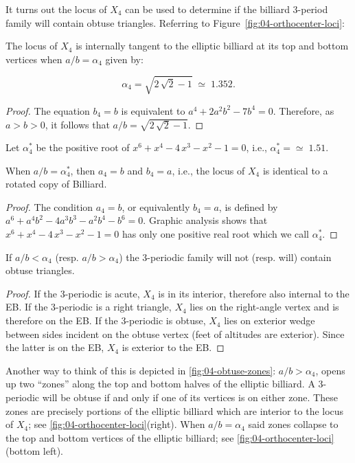 It turns out the locus of $X_4$ can be used to determine if the billiard 3-period family will contain obtuse triangles. Referring to Figure~\ref{fig:04-orthocenter-loci}:

\begin{proposition}
The locus of $X_4$ is internally tangent to the elliptic billiard at its top and bottom vertices when $a/b=\alpha_4$ given by:

\[\alpha_4 = \sqrt{2\,\sqrt {2}-1}\;{\simeq}\;1.352.\]
\label{prop:04-alpha4}
\end{proposition}

\begin{proof}
The equation $b_4=b$ is equivalent to $a^4+2a^2b^2-7b^4=0.$ Therefore, as $a>b>0$, it follows that $a/b=\sqrt{2\,\sqrt {2}-1}.$
\end{proof}

\noindent Let $\alpha_4^*$ be the positive root of
${x}^{6}+{x}^{4}-4\,{x}^{3}-{x}^{2}-1=0$, i.e.,
$\alpha_4^{*}={\simeq}\;1.51$. 

\begin{proposition}
When $a/b=\alpha_4^{*}$, then $a_4=b$ and $b_4=a$, i.e., the locus of $X_4$ is identical to a rotated copy of Billiard. 
\end{proposition}

\begin{proof}
The condition $a_4=b$, or equivalently $b_4=a$, is defined by $a^6+a^4b^2-4a^3b^3-a^2b^4-b^6=0$. Graphic analysis shows that ${x}^{6}+{x}^{4}-4\,{x}^{3}-{x}^{2}-1=0$ has only one positive real root which we call $\alpha_4^*$.
\end{proof}

\begin{theorem}
If $a/b<\alpha_4$ (resp. $a/b>\alpha_4$) the 3-periodic family will not (resp. will) contain obtuse triangles.
\end{theorem}

\begin{proof}
If the 3-periodic is acute, $X_4$ is in its interior, therefore also internal to the EB. If the 3-periodic is a right triangle, $X_4$ lies on the right-angle vertex and is therefore on the EB. If the 3-periodic is obtuse, $X_4$ lies on exterior wedge between sides incident on the obtuse vertex (feet of altitudes are exterior). Since the latter is on the EB, $X_4$ is exterior to the EB.
\end{proof}

Another way to think of this is depicted in \cref{fig:04-obtuse-zones}: $a/b>\alpha_4$, opens up two ``zones'' along the top and bottom halves of the elliptic billiard. A 3-periodic will be obtuse if and only if one of its vertices is on either zone. These zones are precisely portions of the elliptic billiard which are interior to the locus of $X_4$; see \cref{fig:04-orthocenter-loci}(right). When $a/b=\alpha_4$ said zones collapse to the top and bottom vertices of the elliptic billiard; see \cref{fig:04-orthocenter-loci}(bottom left).


